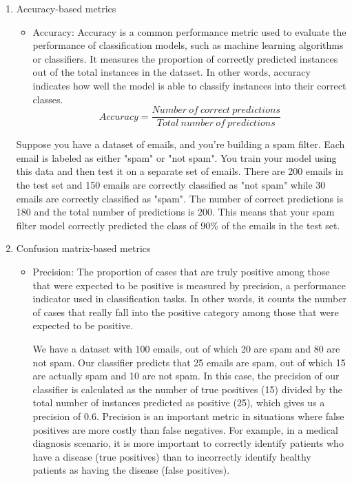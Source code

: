 \documentclass[12pt, a4paper, twoside]{report}
\theoremstyle{plain} %
\theoremstyle{definition} %
\theoremstyle{remark} %
\numberwithin{equation}{chapter}
\begin{document}
\begin{enumerate}

\item Accuracy-based metrics

\begin{itemize}

\item Accuracy: 
Accuracy is a common performance metric used to evaluate the performance of classification models, such as machine learning algorithms or classifiers. It measures the proportion of correctly predicted instances out of the total instances in the dataset. In other words, accuracy indicates how well the model is able to classify instances into their correct classes.
\begin{equation}
\label{eq:Accuracy}
Accuracy = \frac{Number\ of\ correct\ predictions}{Total\ number\ of\ predictions}
\end{equation}
\end{itemize}
Suppose you have a dataset of emails, and you're building a spam filter. Each email is labeled as either "spam" or "not spam". You train your model using this data and then test it on a separate set of emails. There are 200 emails in the test set and 150 emails are correctly classified as "not spam" while 30 emails are correctly classified as "spam". The number of correct predictions is 180 and the total number of predictions is 200. This means that your spam filter model correctly predicted the class of 90\% of the emails in the test set.

\item Confusion matrix-based metrics

\begin{itemize}
\item Precision: The proportion of cases that are truly positive among those that were expected to be positive is measured by precision, a performance indicator used in classification tasks. In other words, it counts the number of cases that really fall into the positive category among those that were expected to be positive.

We have a dataset with 100 emails, out of which 20 are spam and 80 are not spam. Our classifier predicts that 25 emails are spam, out of which 15 are actually spam and 10 are not spam. In this case, the precision of our classifier is calculated as the number of true positives (15) divided by the total number of instances predicted as positive (25), which gives us a precision of 0.6. Precision is an important metric in situations where false positives are more costly than false negatives. For example, in a medical diagnosis scenario, it is more important to correctly identify patients who have a disease (true positives) than to incorrectly identify healthy patients as having the disease (false positives).


\end{itemize}
\end{enumerate}
\end{document}
